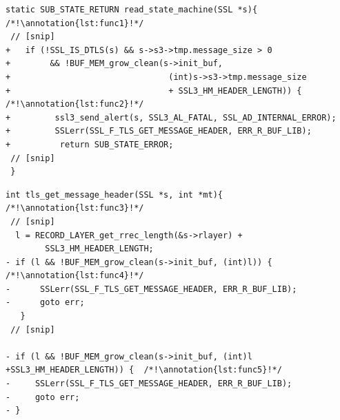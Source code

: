 \documentclass[10pt,conference]{IEEEtran}
\newcounter{lstannotation}
\renewcommand{\thelstannotation}{\ding{\number\numexpr181+\arabic{lstannotation}}}
\newcommand{\annotation}[1]{\refstepcounter{lstannotation}\label{#1}\thelstannotation}
\begin{document}
\medskip
\setcounter{lstannotation}{0}
\begin{lstlisting}[style={CStyle}, caption={Fix provided by OpenSSL developers to the
\\CVE-2016-6307 vulnerability for file ssl/statem/statem.c},label={lst:vuln}]
 static SUB_STATE_RETURN read_state_machine(SSL *s){ /*!\annotation{lst:func1}!*/
 // [snip]
+   if (!SSL_IS_DTLS(s) && s->s3->tmp.message_size > 0
+        && !BUF_MEM_grow_clean(s->init_buf, 
+                                (int)s->s3->tmp.message_size
+                                + SSL3_HM_HEADER_LENGTH)) { /*!\annotation{lst:func2}!*/
+         ssl3_send_alert(s, SSL3_AL_FATAL, SSL_AD_INTERNAL_ERROR);
+         SSLerr(SSL_F_TLS_GET_MESSAGE_HEADER, ERR_R_BUF_LIB);
+          return SUB_STATE_ERROR;
 // [snip]
 }
\end{lstlisting}

\medskip
\setcounter{lstannotation}{0}
\begin{lstlisting}[style={CStyle}, caption={Fix provided by OpenSSL developers to the
\\CVE-2016-6307 vulnerability for file ssl/statem/statem\_lib.c},label={lst:vuln2}]
 int tls_get_message_header(SSL *s, int *mt){  /*!\annotation{lst:func3}!*/
 // [snip]
  l = RECORD_LAYER_get_rrec_length(&s->rlayer) + 
        SSL3_HM_HEADER_LENGTH;
- if (l && !BUF_MEM_grow_clean(s->init_buf, (int)l)) { /*!\annotation{lst:func4}!*/
-      SSLerr(SSL_F_TLS_GET_MESSAGE_HEADER, ERR_R_BUF_LIB);
-      goto err;
   }
 // [snip]
 
- if (l && !BUF_MEM_grow_clean(s->init_buf, (int)l +SSL3_HM_HEADER_LENGTH)) {  /*!\annotation{lst:func5}!*/  
-     SSLerr(SSL_F_TLS_GET_MESSAGE_HEADER, ERR_R_BUF_LIB);
-     goto err;
- }

\end{lstlisting}
%
\end{document}
